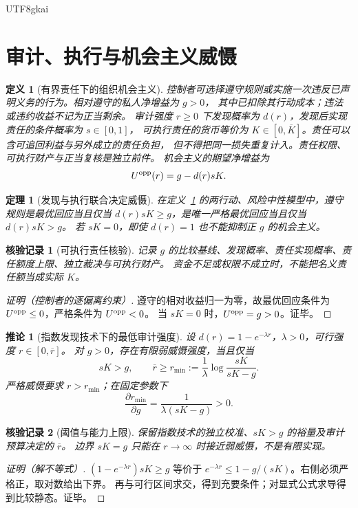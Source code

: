 \documentclass[12pt,a4paper,openany]{report}
\newtheorem{definition}{定义}[chapter]
\newtheorem{theorem}{定理}[chapter]
\newtheorem{corollary}{推论}[chapter]
\newtheorem{Certificate}{核验记录}[chapter]
\begin{document}
\begin{CJK*}{UTF8}{gkai}
\section{审计、执行与机会主义威慑}

\begin{definition}[有界责任下的组织机会主义]
\label{def:opportunism}
控制者可选择遵守规则或实施一次违反已声明义务的行为。相对遵守的私人净增益为 $g>0$，
其中已扣除其行动成本；违法或违约收益不记为正当剩余。
审计强度 $r\ge0$ 下发现概率为 $d(r)$，发现后实现责任的条件概率为 $s\in[0,1]$，
可执行责任的货币等价为 $K\in[0,\overline K]$。责任可以含可追回利益与另外成立的责任负担，
但不得把同一损失重复计入。责任权限、可执行财产与正当复核是独立前件。
机会主义的期望净增益为
\[
 U^{\rm opp}(r)=g-d(r)sK.
\]
\end{definition}

\begin{theorem}[发现与执行联合决定威慑]
\label{thm:deterrence}
在定义~\ref{def:opportunism} 的两行动、风险中性模型中，遵守规则是最优回应当且仅当
$d(r)sK\ge g$，是唯一严格最优回应当且仅当 $d(r)sK>g$。
若 $sK=0$，即使 $d(r)=1$ 也不能抑制正 $g$ 的机会主义。
\end{theorem}
\begin{Certificate}[可执行责任核验]
记录 $g$ 的比较基线、发现概率、责任实现概率、责任额度上限、独立裁决与可执行财产。
资金不足或权限不成立时，不能把名义责任额当成实际 $K$。
\end{Certificate}
\begin{proof}[证明（控制者的逐偏离约束）]
遵守的相对收益归一为零，故最优回应条件为 $U^{\rm opp}\le0$，严格条件为 $U^{\rm opp}<0$。
当 $sK=0$ 时，$U^{\rm opp}=g>0$。证毕。
\end{proof}

\begin{corollary}[指数发现技术下的最低审计强度]
\label{cor:rmin}
设 $d(r)=1-e^{-\lambda r}$，$\lambda>0$，可行强度 $r\in[0,\overline r]$。
对 $g>0$，存在有限弱威慑强度，当且仅当
\[
 sK>g,\qquad
 \overline r\ge r_{\min}:=\frac1\lambda\log\frac{sK}{sK-g}.
\]
严格威慑要求 $r>r_{\min}$；在固定参数下
\[
 \frac{\partial r_{\min}}{\partial g}=\frac1{\lambda(sK-g)}>0.
\]
\end{corollary}
\begin{Certificate}[阈值与能力上限]
保留指数技术的独立校准、$sK>g$ 的裕量及审计预算决定的 $\overline r$。
边界 $sK=g$ 只能在 $r\to\infty$ 时接近弱威慑，不是有限实现。
\end{Certificate}
\begin{proof}[证明（解不等式）]
$(1-e^{-\lambda r})sK\ge g$ 等价于
$e^{-\lambda r}\le1-g/(sK)$。右侧必须严格正，取对数给出下界。
再与可行区间求交，得到充要条件；对显式公式求导得到比较静态。证毕。
\end{proof}


\end{CJK*}
\end{document}

